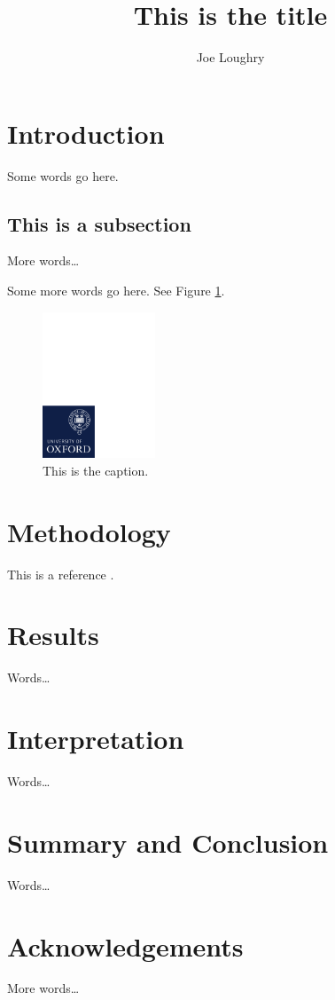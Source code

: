 \documentclass[10pt,a4paper]{article}
\begin{document}
\title{This is the title}

\author{Joe Loughry}

\maketitle

\begin{abstract}
	
\end{abstract}

\section{Introduction}

Some words go here.

\subsection{This is a subsection}

More words\ldots

\newpage

Some more words go here. See Figure \ref{figure:whatever}.

\begin{figure}[!t]
    \centering
	\includegraphics[width=0.3\textwidth,trim=0 0 117mm 183mm,clip]{graphics/ox_brand_cmyk_pos.pdf}
	\caption{This is the caption.}
	\label{figure:whatever}
\end{figure}

\section{Methodology}

This is a reference \cite{Loughry2013a}.

\section{Results}

Words\ldots

\section{Interpretation}

Words\ldots

\section{Summary and Conclusion}

Words\ldots

\section{Acknowledgements}

More words\ldots



\end{document}
